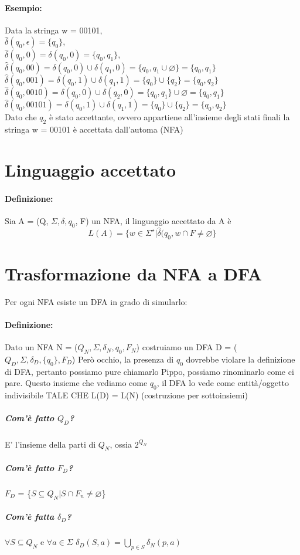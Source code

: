 \documentclass[12pt, a4paper, openany, oneside]{book}
\begin{document}
\paragraph{Esempio: }Data la stringa w = 00101, \\
$\widehat{\delta}(q_{0}, \epsilon) = \{q_{0}\}$, \\
$\widehat{\delta}(q_{0}, 0) = \delta(q_{0},0) = \{q_{0}, q_{1}\}$, \\
$\widehat{\delta}(q_{0}, 00) = \delta(q_{0},0) \cup \delta(q_{1},0) = 
\{q_{0},q_{1}\cup \varnothing\} = \{q_{0},q_{1}\}$\\
$\widehat{\delta}(q_{0}, 001) = \delta(q_{0},1) \cup \delta(q_{1},1) = 
\{q_{0}\} \cup \{q_{2}\} = \{q_{0}, q_{2}\}$ \\
$\widehat{\delta}(q_{0}, 0010) = \delta(q_{0},0) \cup \delta(q_{2},0) =
\{q_{0},q_{1}\}\cup \varnothing = \{q_{0},q_{1}\}$ \\
$\widehat{\delta}(q_{0}, 00101) = \delta(q_{0}, 1) \cup \delta(q_{1},1) =
\{q_{0}\}\cup \{q_{2}\} = \{q_{0}, q_{2}\}$ \\
Dato che $q_{2}$ è stato accettante, ovvero appartiene all'insieme degli stati finali
la stringa w = 00101 è accettata dall'automa (NFA)
\section{Linguaggio accettato}
\paragraph{Definizione: }Sia A = (Q, $\Sigma, \delta, q_{0}$, F) un NFA, il 
linguaggio accettato da A è 
\[
L(A)=\{w\in \Sigma^{\star} | \widehat{\delta}(q_{0},w \cap F \neq \varnothing\}
\]
\section{Trasformazione da NFA a DFA}
Per ogni NFA esiste un DFA in grado di simularlo:
\paragraph{Definizione: }Dato un NFA N = ($Q_{N}, \Sigma, \delta_{N},q_{0}, F_{N}$)
costruiamo un DFA D = ($Q_{D},\Sigma, \delta_{D},\{q_{0}\}, F_{D}$)
Però occhio, la presenza di $q_{0}$ dovrebbe violare la definizione di DFA, 
pertanto possiamo pure chiamarlo Pippo, possiamo rinominarlo come ci pare. 
Questo insieme che vediamo come $q_{0}$, il DFA lo vede come entità/oggetto 
indivisibile TALE CHE L(D) = L(N) (costruzione per sottoinsiemi) %
\subparagraph{Com'è fatto $Q_{D}$?} E' l'insieme della parti di $Q_{N}$, ossia $2^{Q_{N}}$
\subparagraph{Com'è fatto $F_{D}$?} $F_{D}$ = \{$S \subseteq Q_{N}|S\cap F_{n}\neq 
\varnothing$\}	
\subparagraph{Com'è fatta $\delta_{D}$?} $\forall S \subseteq Q_{N}$ e $\forall a \in \Sigma$
$\delta_{D}(S,a) = \bigcup \limits_{p \in S} \delta_{N}(p,a)$	
\end{document}

